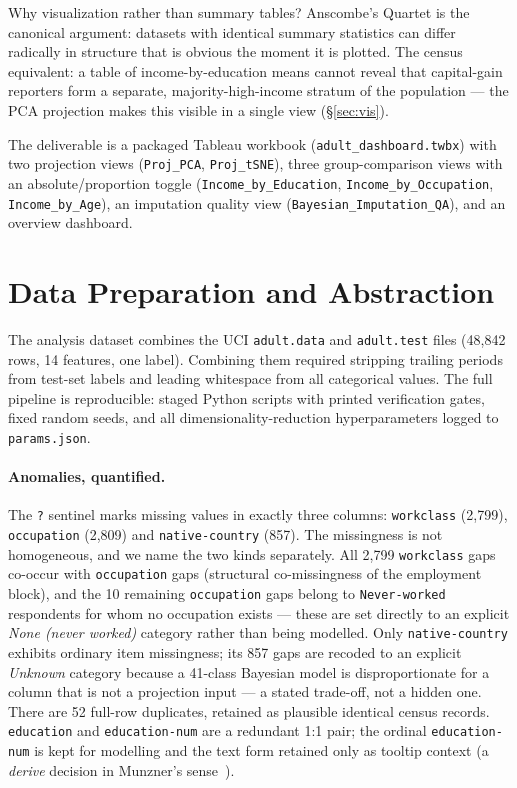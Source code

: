 \documentclass[11pt,a4paper]{article}
\begin{document}
Why visualization rather than summary tables? Anscombe's Quartet
\cite[pp.~8--9]{munzner} is the canonical argument: datasets with identical
summary statistics can differ radically in structure that is obvious the
moment it is plotted. The census equivalent: a table of income-by-education
means cannot reveal that capital-gain reporters form a separate,
majority-high-income stratum of the population --- the PCA projection makes
this visible in a single view (\S\ref{sec:vis}).

The deliverable is a packaged Tableau workbook
(\texttt{adult\_dashboard.twbx}) with two projection views
(\texttt{Proj\_PCA}, \texttt{Proj\_tSNE}), three group-comparison views with
an absolute/proportion toggle (\texttt{Income\_by\_Education},
\texttt{Income\_by\_Occupation}, \texttt{Income\_by\_Age}), an imputation
quality view (\texttt{Bayesian\_Imputation\_QA}), and an overview dashboard.

\section{Data Preparation and Abstraction}\label{sec:data}
The analysis dataset combines the UCI \texttt{adult.data} and
\texttt{adult.test} files (48{,}842 rows, 14 features, one label).
Combining them required stripping trailing periods from test-set labels
and leading whitespace from all categorical values. The full pipeline is
reproducible: staged Python scripts with printed verification gates, fixed
random seeds, and all dimensionality-reduction hyperparameters logged to
\texttt{params.json}.

\paragraph{Anomalies, quantified.}
The \texttt{?} sentinel marks missing values in exactly three columns:
\texttt{workclass} (2{,}799), \texttt{occupation} (2{,}809) and
\texttt{native-country} (857). The missingness is not homogeneous, and we
name the two kinds separately. All 2{,}799 \texttt{workclass} gaps co-occur
with \texttt{occupation} gaps (structural co-missingness of the employment
block), and the 10 remaining \texttt{occupation} gaps belong to
\texttt{Never-worked} respondents for whom no occupation exists ---
these are set directly to an explicit \emph{None (never worked)} category
rather than being modelled. Only \texttt{native-country} exhibits ordinary
item missingness; its 857 gaps are recoded to an explicit \emph{Unknown}
category because a 41-class Bayesian model is disproportionate for a column
that is not a projection input --- a stated trade-off, not a hidden one.
There are 52 full-row duplicates, retained as plausible identical census
records. \texttt{education} and \texttt{education-num} are a redundant 1:1
pair; the ordinal \texttt{education-num} is kept for modelling and the text
form retained only as tooltip context (a \emph{derive} decision in Munzner's
sense~\cite[pp.~49--53]{munzner}).
\end{document}
